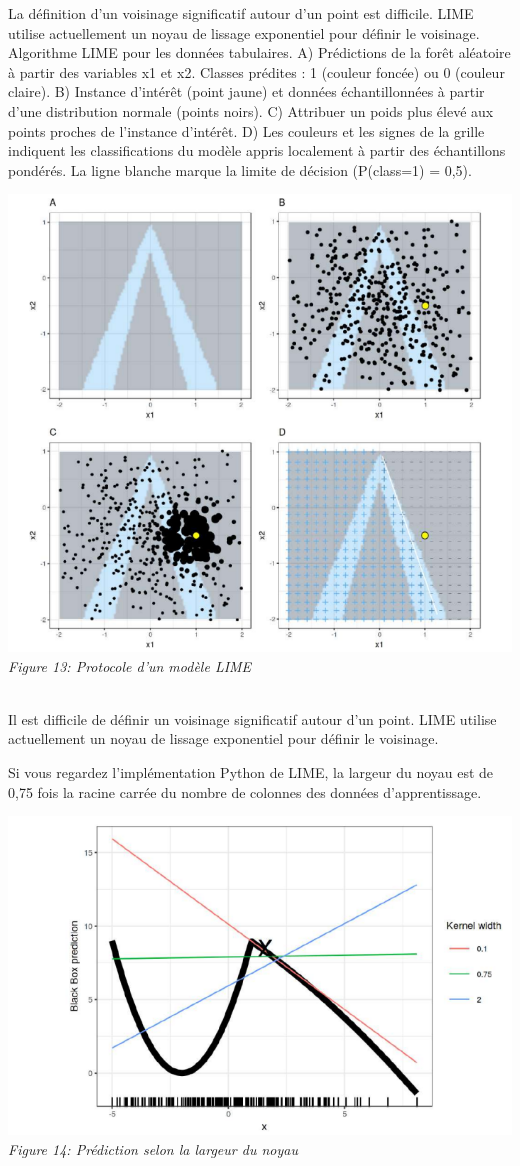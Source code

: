 La définition d'un voisinage significatif autour d'un point est difficile. LIME utilise actuellement un noyau de lissage exponentiel pour définir le voisinage.
Algorithme LIME pour les données tabulaires. 
A) Prédictions de la forêt aléatoire à partir des variables x1 et x2. Classes prédites : 1 (couleur foncée) ou 0 (couleur claire). 
B) Instance d'intérêt (point jaune) et données échantillonnées à partir d'une distribution normale (points noirs). 
C) Attribuer un poids plus élevé aux points proches de l'instance d'intérêt. 
D) Les couleurs et les signes de la grille indiquent les classifications du modèle appris localement à partir des échantillons pondérés. La ligne blanche marque la limite de décision (P(class=1) = 0,5).
\begin{center}
    \centering
    \includegraphics[width=0.7\linewidth]{Images/lime.png}
    \\
    \emph{Figure 13: Protocole d'un modèle LIME}
    \\
\end{center}
\\

Il est difficile de définir un voisinage significatif autour d'un point. LIME utilise actuellement un noyau de lissage exponentiel pour définir le voisinage. 

Si vous regardez l'implémentation Python de LIME, la largeur du noyau est de 0,75 fois la racine carrée du nombre de colonnes des données d'apprentissage.
\begin{center}
    \centering
    \includegraphics[width=0.7\linewidth]{Images/lime_width.png}
    \\
    \emph{Figure 14: Prédiction selon la largeur du noyau}
    \\
\end{center}
\\

